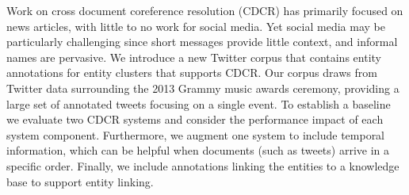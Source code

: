 Work on cross document coreference resolution (CDCR) has primarily focused on news articles, with little to no work for social media. Yet social media may be particularly challenging since short messages provide little context, and informal names are pervasive. We introduce a new Twitter corpus that contains entity annotations for entity clusters that supports CDCR. Our corpus draws from Twitter data surrounding the 2013 Grammy music awards ceremony, providing a large set of annotated tweets focusing on a single event. To establish a baseline we evaluate two CDCR systems and consider the performance impact of each system component. Furthermore, we augment one system to include temporal information, which can be helpful when documents (such as tweets) arrive in a specific order. Finally, we include annotations linking the entities to a knowledge base to support entity linking.
